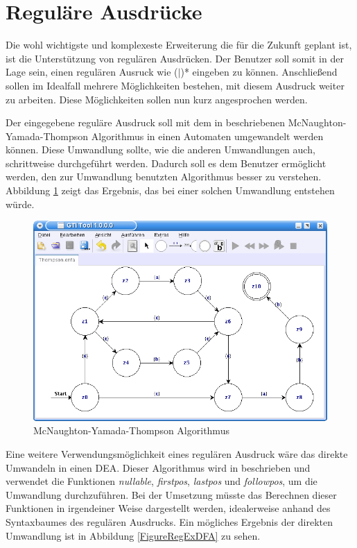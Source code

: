 \section{Reguläre Ausdrücke}

Die wohl wichtigste und komplexeste Erweiterung die für die Zukunft geplant
ist, ist die Unterstützung von regulären Ausdrücken. Der Benutzer soll somit in
der Lage sein, einen regulären Ausruck wie
($\mid$)* eingeben zu können.
Anschließend sollen im Idealfall mehrere Möglichkeiten bestehen, mit diesem
Ausdruck weiter zu arbeiten. Diese Möglichkeiten sollen nun kurz angesprochen
werden.\vspace{10pt}

Der eingegebene reguläre Ausdruck soll mit dem in 
beschriebenen McNaughton-Yamada-Thompson Algorithmus in einen Automaten
umgewandelt werden können. Diese Umwandlung sollte, wie die anderen
Umwandlungen auch, schrittweise durchgeführt werden. Dadurch soll es dem
Benutzer ermöglicht werden, den zur Umwandlung benutzten Algorithmus besser zu
verstehen. Abbildung \ref{FigureThompson} zeigt das Ergebnis, das bei einer
solchen Umwandlung entstehen würde.\vspace{10pt}

\begin{figure}[h!]
\begin{center}
\includegraphics[width=12cm]{../images/thompson.png}
\caption{McNaughton-Yamada-Thompson Algorithmus}
\label{FigureThompson}
\end{center}
\end{figure}

Eine weitere Verwendungsmöglichkeit eines regulären Ausdruck wäre das direkte
Umwandeln in einen DEA. Dieser Algorithmus wird in
 beschrieben und verwendet die Funktionen
\textit{nullable}, \textit{firstpos}, \textit{lastpos} und \textit{followpos},
um die Umwandlung durchzuführen. Bei der Umsetzung müsste das Berechnen dieser
Funktionen in irgendeiner Weise dargestellt werden, idealerweise anhand des
Syntaxbaumes des regulären Ausdrucks. Ein mögliches Ergebnis der direkten
Umwandlung ist in Abbildung \ref{FigureRegExDFA} zu sehen.\vspace{10pt}

